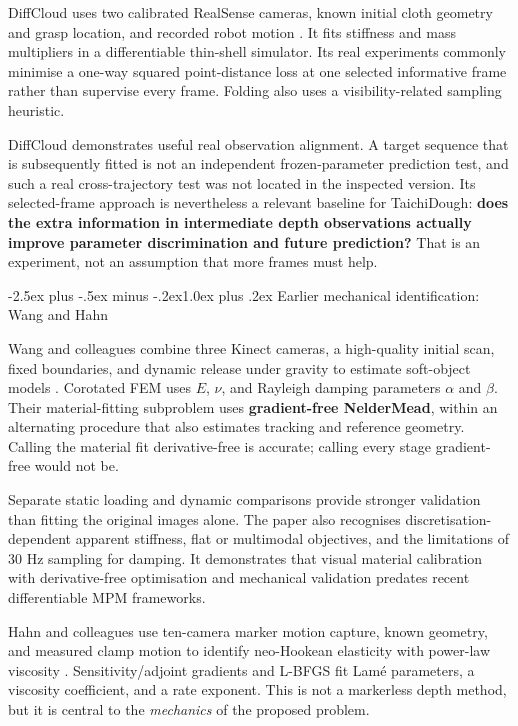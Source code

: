 \documentclass[
  11pt,
]{article}
\makeatletter
\renewcommand\subsection{\needspace{5\baselineskip}\@startsection{subsection}{2}{\z@}%
  {-2.5ex plus -.5ex minus -.2ex}{1.0ex plus .2ex}%
  {\normalfont\sffamily\large\bfseries\color{accent}}}
\makeatother
\begin{document}
DiffCloud uses two calibrated RealSense cameras, known initial cloth
geometry and grasp location, and recorded robot motion
. It fits stiffness and mass
multipliers in a differentiable thin-shell simulator. Its real
experiments commonly minimise a one-way squared point-distance loss at
one selected informative frame rather than supervise every frame.
Folding also uses a visibility-related sampling heuristic.

DiffCloud demonstrates useful real observation alignment. A target
sequence that is subsequently fitted is not an independent
frozen-parameter prediction test, and such a real cross-trajectory test
was not located in the inspected version. Its selected-frame approach is
nevertheless a relevant baseline for TaichiDough: \textbf{does the extra
information in intermediate depth observations actually improve
parameter discrimination and future prediction?} That is an experiment,
not an assumption that more frames must help.

\subsection{Earlier mechanical identification: Wang and
Hahn}\label{earlier-mechanical-identification-wang-and-hahn}

Wang and colleagues combine three Kinect cameras, a high-quality initial
scan, fixed boundaries, and dynamic release under gravity to estimate
soft-object models . Corotated FEM uses
\(E\), \(\nu\), and Rayleigh damping parameters \(\alpha\) and
\(\beta\). Their material-fitting subproblem uses \textbf{gradient-free
Nelder\textendash{}\allowbreak{}Mead}, within an alternating procedure
that also estimates tracking and reference geometry. Calling the
material fit derivative-free is accurate; calling every stage
gradient-free would not be.

Separate static loading and dynamic comparisons provide stronger
validation than fitting the original images alone. The paper also
recognises discretisation-dependent apparent stiffness, flat or
multimodal objectives, and the limitations of 30 Hz sampling for
damping. It demonstrates that visual material calibration with
derivative-free optimisation and mechanical validation predates recent
differentiable MPM frameworks.

Hahn and colleagues use ten-camera marker motion capture, known
geometry, and measured clamp motion to identify neo-Hookean elasticity
with power-law viscosity .
Sensitivity/adjoint gradients and L-BFGS fit Lamé parameters, a
viscosity coefficient, and a rate exponent. This is not a markerless
depth method, but it is central to the \emph{mechanics} of the proposed
problem.
\end{document}
